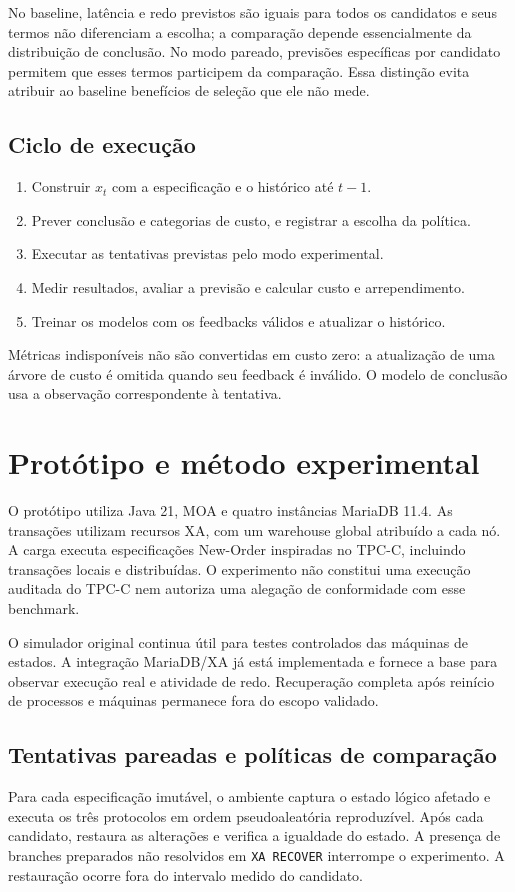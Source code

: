 \documentclass[12pt,a4paper]{article}
\begin{document}
No baseline, latência e redo previstos são iguais para todos os candidatos e seus termos não diferenciam a escolha; a comparação depende essencialmente da distribuição de conclusão. No modo pareado, previsões específicas por candidato permitem que esses termos participem da comparação. Essa distinção evita atribuir ao baseline benefícios de seleção que ele não mede.

\subsection{Ciclo de execução}
\begin{enumerate}
\item Construir $x_t$ com a especificação e o histórico até $t-1$.
\item Prever conclusão e categorias de custo, e registrar a escolha da política.
\item Executar as tentativas previstas pelo modo experimental.
\item Medir resultados, avaliar a previsão e calcular custo e arrependimento.
\item Treinar os modelos com os feedbacks válidos e atualizar o histórico.
\end{enumerate}
Métricas indisponíveis não são convertidas em custo zero: a atualização de uma árvore de custo é omitida quando seu feedback é inválido. O modelo de conclusão usa a observação correspondente à tentativa.

\section{Protótipo e método experimental}
O protótipo utiliza Java 21, MOA e quatro instâncias MariaDB 11.4. As transações utilizam recursos XA, com um warehouse global atribuído a cada nó. A carga executa especificações New-Order inspiradas no TPC-C, incluindo transações locais e distribuídas. O experimento não constitui uma execução auditada do TPC-C nem autoriza uma alegação de conformidade com esse benchmark.

O simulador original continua útil para testes controlados das máquinas de estados. A integração MariaDB/XA já está implementada e fornece a base para observar execução real e atividade de redo. Recuperação completa após reinício de processos e máquinas permanece fora do escopo validado.

\subsection{Tentativas pareadas e políticas de comparação}
Para cada especificação imutável, o ambiente captura o estado lógico afetado e executa os três protocolos em ordem pseudoaleatória reproduzível. Após cada candidato, restaura as alterações e verifica a igualdade do estado. A presença de branches preparados não resolvidos em \texttt{XA RECOVER} interrompe o experimento. A restauração ocorre fora do intervalo medido do candidato.
\end{document}
